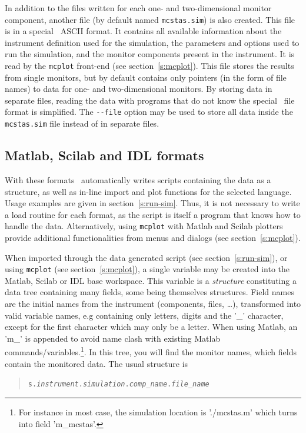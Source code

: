 In addition to the files written for each one- and two-dimensional
monitor component, another file (by default named \verb+mcstas.sim+) is
also created. This file is in a special \MCS\ ASCII format. It contains
all available information about the instrument definition used for the
simulation, the parameters and options used to run the simulation, and
the monitor components present in the instrument. It is read by the
\verb+mcplot+ front-end (see section~\ref{s:mcplot}). This file stores
the results from single monitors, but by default contains only pointers
(in the form of file names) to data for one- and two-dimensional
monitors. By storing data in separate files, reading the data with
programs that do not know the special \MCS\ file format is
simplified. The \verb+--file+ option may be used to store all data
inside the \verb+mcstas.sim+ file instead of in separate files.

\subsection{Matlab, Scilab and IDL formats}
   

With these formats \MCS\ automatically writes scripts containing the data as a structure, as well as in-line import and plot functions for the selected language. Usage examples are given in section~\ref{s:run-sim}.
Thus, it is not necessary to write a load routine for each format, as the script is itself a program that knows how to handle the data. Alternatively, using \verb+mcplot+ with Matlab and Scilab plotters provide additional functionalities from menus and dialogs (see section~\ref{s:mcplot}).

When imported through the data generated script (see section~\ref{s:run-sim}), or using \verb+mcplot+ (see section~\ref{s:mcplot}), a single variable may be created into the Matlab, Scilab or IDL base workspace. This variable is a \emph{structure} constituting a data tree containing many fields, some being themselves structures. Field names are the initial names from the instrument (components, files, \ldots), transformed into valid variable names, e.g containing only letters, digits and the '\_' character, except for the first character which may only be a letter. When using Matlab, an 'm\_' is appended to avoid name clash with existing Matlab commands/variables.\footnote{For instance in most case, the simulation location is './mcstas.m' which turns into field 'm\_mcstas'.}.
In this tree, you will find the monitor names, which fields contain the monitored data. The usual structure is
\begin{quote}
  \texttt{s.{\it instrument}.{\it simulation}.{\it comp\_name}.{\it file\_name}}
\end{quote}

